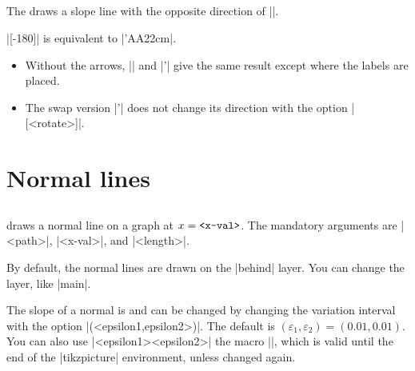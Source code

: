 \subsection{\protect{}}
\label{ss:tzslope'}

The   draws a slope line with the opposite direction of |\tzslope|.

\begin{tzcode}{.3}
\end{tzcode}

\remark 
|[-180]| is equivalent to |\tzslope'{AA}{2}{2cm}|.

\begin{itemize}
\item Without the arrows, |\tzslope| and |\tzslope'| give the same result except where the labels are placed.
\item
The swap version |\tzslope'| does not change its direction with the option |[<rotate>]|.
\end{itemize}


\section{Normal lines}
\label{s:normals}

\subsection{\protect\cmd{\tznormalat}}
\label{ss:tznormalat}

\icmd{\tznormalat} draws a normal line  on a graph at $x=\mbox{\texttt{<x-val>}}$.
The mandatory arguments are |{<path>}|, |{<x-val>}|, and |{<length>}|.

By default, the normal lines are drawn on the |behind| layer.
You can change the layer, like \icmd{\settztnormallayer}|{main}|.

\remark The slope of a normal  is  and can be changed by changing the variation interval with the option |(<epsilon1,epsilon2>)|. The default is $(\varepsilon_1,\varepsilon_2)=(0.01,0.01)$.
You can also use
\icmd{\settznormalepsilon}|{<epsilon1>}{<epsilon2>}|  the macro |\tznormalat|, which is valid until the end of the |tikzpicture| environment, unless changed again.


